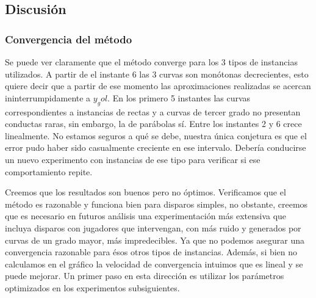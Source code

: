 \subsection{Discusión}
\subsubsection{Convergencia del método}
Se puede ver claramente que el método converge para los 3 tipos de instancias utilizados. A partir de el instante 6
las 3 curvas son monótonas decrecientes, esto quiere decir que a partir de ese momento las aproximaciones realizadas 
se acercan ininterrumpidamente a $y_gol$. En los primero 5 instantes las curvas correspondientes a instancias 
de rectas y a curvas de tercer grado no presentan conductas raras, sin embargo, la de parábolas sí. 
Entre los instantes 2 y 6 crece linealmente. No estamos seguros a qué se debe, nuestra única conjetura es que el error
pudo haber sido casualmente creciente en ese intervalo. Debería conducirse un nuevo experimento con instancias de ese tipo
para verificar si ese comportamiento repite.
\par
Creemos que los resultados son buenos pero no óptimos. Verificamos que el método es razonable y funciona bien para 
disparos simples, no obstante, creemos que es necesario en futuros análisis una experimentación más extensiva que incluya
disparos con jugadores que intervengan, con más ruido y generados por curvas de un grado mayor, más impredecibles. Ya que
no podemos asegurar una convergencia razonable para ésos otros tipos de instancias. Además, si bien no calculamos
en el gráfico la velocidad de convergencia intuimos que es lineal y se puede mejorar. Un primer paso en esta dirección
es utilizar los parámetros optimizados en los experimentos subsiguientes.

